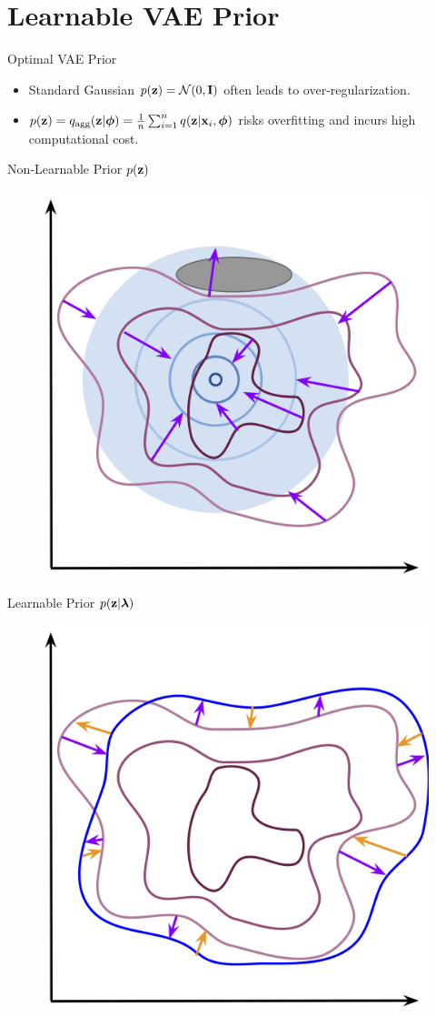 \documentclass{beamer}
\begin{document}
\section{Learnable VAE Prior}
\begin{frame}{Optimal VAE Prior}
	\begin{itemize}
		\item Standard Gaussian $p(\mathbf{z}) = \mathcal{N}(0, \mathbf{I})$ often leads to over-regularization.
		\item $p(\mathbf{z}) = q_{\text{agg}}(\mathbf{z} | \boldsymbol{\phi}) = \frac{1}{n}\sum_{i=1}^n q(\mathbf{z} | \mathbf{x}_i, \boldsymbol{\phi})$ risks overfitting and incurs high computational cost.
	\end{itemize}
    \eqpause
	\vspace{-0.5cm}
	\begin{minipage}[t]{0.5\columnwidth}
		\begin{block}{Non-Learnable Prior $p(\mathbf{z})$}
			\begin{figure}[h]
				\centering
				\includegraphics[width=0.6\linewidth]{figs/non_learnable_prior}
			\end{figure}
		\end{block}
	\end{minipage}%
	\begin{minipage}[t]{0.5\columnwidth}
		\begin{block}{Learnable Prior $p(\mathbf{z} | \boldsymbol{\lambda})$}
			\begin{figure}[h]
				\centering
				\includegraphics[width=0.6\linewidth]{figs/learnable_prior}

\end{figure}
\end{block}
\end{minipage}
\end{frame}
\end{document}
